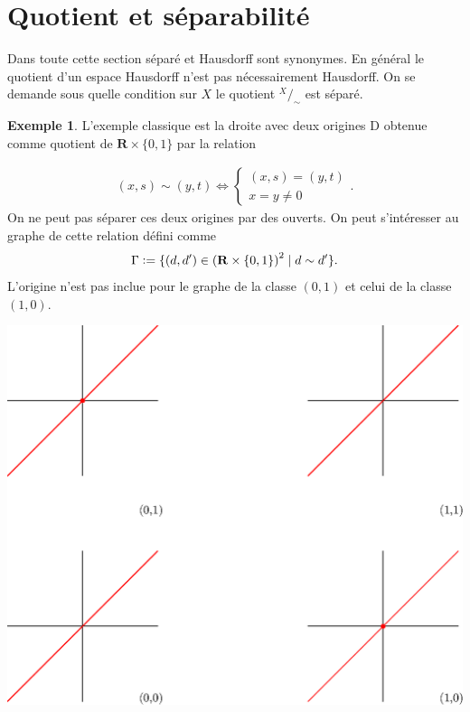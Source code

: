 \documentclass[12pt]{book}
\newcommand{\defeq}{\vcentcolon=}
\theoremstyle{definition}
\newtheorem{example}[lemma]{Exemple}
\theoremstyle{remark}
\newcommand*\quot[2]{{^{\textstyle #1}\big/_{\textstyle #2}}}
\begin{document}
	\section{Quotient et séparabilité}
	Dans toute cette section séparé et Hausdorff sont synonymes. En général le quotient d'un espace Hausdorff n'est pas nécessairement Hausdorff. On se demande sous quelle condition sur $X$ le quotient $\quot{X}{\sim}$ est séparé.
	\begin{example}
		L'exemple classique est la droite avec deux origines D obtenue comme quotient de $\mathbf{R}\times \{0,1\}$ par la relation \\
		\begin{minipage}{0.5\textwidth}
			\begin{align*}
				(x,s) \sim (y,t) \iff \begin{cases}
					(x,s) = (y,t) \\
					x = y \neq 0
				\end{cases}
			.\end{align*}
			On ne peut pas séparer ces deux origines par des ouverts. On peut s'intéresser au graphe de cette relation défini comme \[\Gamma \defeq \{(d,d') \in {(\mathbf{R}\times \{0,1\})}^2  \;|\; d\sim d'\}.\] L'origine n'est pas inclue pour le graphe de la classe $(0,1)$ et celui de la classe $(1,0)$.
		\end{minipage}
		\hfill
		\begin{minipage}{0.5\textwidth}
			\centering
			\includegraphics[scale=0.5]{graph.eps}
		\end{minipage}
	\end{example}
\end{document}
